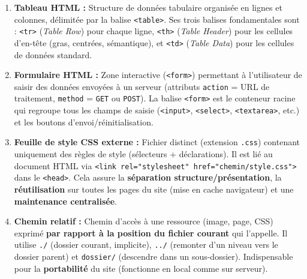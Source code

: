 \documentclass[11pt]{article}
\begin{document}
\begin{corrige}
\begin{enumerate}
  \item \textbf{Tableau HTML :} Structure de données tabulaire organisée en lignes et colonnes, délimitée par la balise \texttt{<table>}. Ses trois balises fondamentales sont : \texttt{<tr>} (\emph{Table Row}) pour chaque ligne, \texttt{<th>} (\emph{Table Header}) pour les cellules d'en-tête (gras, centrées, sémantique), et \texttt{<td>} (\emph{Table Data}) pour les cellules de données standard.
  
  \item \textbf{Formulaire HTML :} Zone interactive (\texttt{<form>}) permettant à l'utilisateur de saisir des données envoyées à un serveur (attributs \texttt{action} = URL de traitement, \texttt{method} = \texttt{GET} ou \texttt{POST}). La balise \texttt{<form>} est le conteneur racine qui regroupe tous les champs de saisie (\texttt{<input>}, \texttt{<select>}, \texttt{<textarea>}, etc.) et les boutons d'envoi/réinitialisation.
  
  \item \textbf{Feuille de style CSS externe :} Fichier distinct (extension \texttt{.css}) contenant uniquement des règles de style (sélecteurs + déclarations). Il est lié au document HTML via \texttt{<link rel="stylesheet" href="chemin/style.css">} dans le \texttt{<head>}. Cela assure la \textbf{séparation structure/présentation}, la \textbf{réutilisation} sur toutes les pages du site (mise en cache navigateur) et une \textbf{maintenance centralisée}.
  
  \item \textbf{Chemin relatif :} Chemin d'accès à une ressource (image, page, CSS) exprimé \textbf{par rapport à la position du fichier courant} qui l'appelle. Il utilise \texttt{./} (dossier courant, implicite), \texttt{../} (remonter d'un niveau vers le dossier parent) et \texttt{dossier/} (descendre dans un sous-dossier). Indispensable pour la \textbf{portabilité} du site (fonctionne en local comme sur serveur).
\end{enumerate}
\end{corrige}
\end{document}
